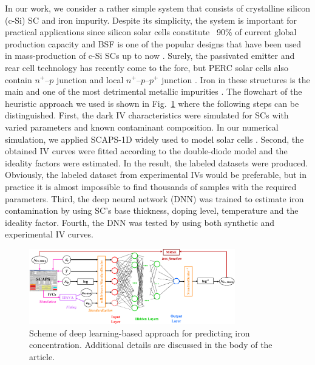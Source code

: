 \documentclass[num-refs]{wiley-article} %
\begin{document}
In our work,
we consider a rather simple system
that consists of crystalline silicon (c-Si) SC  and iron impurity.
Despite its simplicity, the system is important for practical applications
since  silicon solar cells constitute ~90\% of current global production capacity \cite{SCRev2015}
and BSF  is one of  the popular designs that have been used
in mass-production of c-Si SCs up to now \cite{SCRev2020,GreenRew2019}.
Surely, the passivated emitter and rear cell technology has
recently come to the fore, but PERC solar cells also contain $n^+$--$p$ junction
and local $n^+$--$p$--$p^{+}$ junction \cite{GreenRew2019,WilsonRew2020}.
Iron in these structures is the main and one of the most detrimental metallic impurities \cite{ZHU2016192,FeB:Schmidt,IronSC}.
The flowchart of the heuristic approach we used is shown in Fig.~\ref{fig_chem}
where the following steps can be distinguished.
First, the dark IV characteristics were simulated for SCs with varied parameters
and known contaminant composition.
In our numerical simulation,  we applied SCAPS-1D \cite{SCAPS1,SCAPS2}
widely used to model solar cells \cite{SCAPSuseSi4,SCAPSuseSi1,SCAPSuseSi6,SCAPSuse1,SCAPSuse2020,SCAPSuse2017SM}.
Second, the obtained IV curves were fitted according to the double-diode model
and the ideality factors were estimated.
In the result, the labeled datasets were produced.
Obviously, the labeled dataset from experimental IVs  would be preferable,
but in practice it is almost impossible to find thousands of samples
with the required parameters.
Third, the deep neural network (DNN) was trained to estimate iron contamination
by using SC's base thickness, doping level, temperature and the ideality factor.
Fourth, the DNN was tested by using both synthetic and experimental IV curves.

\begin{figure}
\centering
\includegraphics[width=0.8\textwidth]{Chem}
\caption{Scheme of deep learning-based approach for predicting iron concentration.
Additional details are discussed in the body of the article.
}
\label{fig_chem}
\end{figure}
\end{document}
